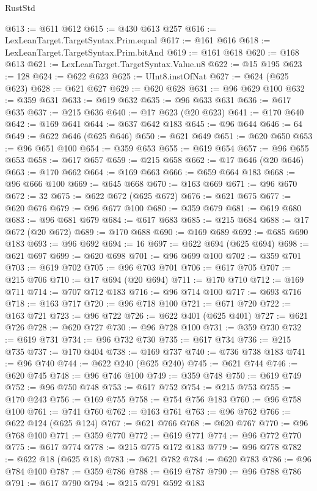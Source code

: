 \begin{lexlean}{RustStd}
\begin{coremodule}
@613 := @611 @612
@615 := @430 @613 @257
@616 := LexLeanTarget.TargetSyntax.Prim.equal
@617 := @161 @616
@618 := LexLeanTarget.TargetSyntax.Prim.bitAnd
@619 := @161 @618
@620 := @168 @613
@621 := LexLeanTarget.TargetSyntax.Value.u8
@622 := @15 @195
@623 := 128
@624 := @622 @623
@625 := UInt8.instOfNat
@627 := @624 (@625 @623)
@628 := @621 @627
@629 := @620 @628
@631 := @96 @629 @100
@632 := @359 @631
@633 := @619 @632
@635 := @96 @633 @631
@636 := @617 @635
@637 := @215 @636
@640 := @17 @623 (@20 @623)
@641 := @170 @640
@642 := @169 @641
@644 := @637 @642 @183
@645 := @96 @644
@646 := 64
@649 := @622 @646 (@625 @646)
@650 := @621 @649
@651 := @620 @650
@653 := @96 @651 @100
@654 := @359 @653
@655 := @619 @654
@657 := @96 @655 @653
@658 := @617 @657
@659 := @215 @658
@662 := @17 @646 (@20 @646)
@663 := @170 @662
@664 := @169 @663
@666 := @659 @664 @183
@668 := @96 @666 @100
@669 := @645 @668
@670 := @163 @669
@671 := @96 @670
@672 := 32
@675 := @622 @672 (@625 @672)
@676 := @621 @675
@677 := @620 @676
@679 := @96 @677 @100
@680 := @359 @679
@681 := @619 @680
@683 := @96 @681 @679
@684 := @617 @683
@685 := @215 @684
@688 := @17 @672 (@20 @672)
@689 := @170 @688
@690 := @169 @689
@692 := @685 @690 @183
@693 := @96 @692
@694 := 16
@697 := @622 @694 (@625 @694)
@698 := @621 @697
@699 := @620 @698
@701 := @96 @699 @100
@702 := @359 @701
@703 := @619 @702
@705 := @96 @703 @701
@706 := @617 @705
@707 := @215 @706
@710 := @17 @694 (@20 @694)
@711 := @170 @710
@712 := @169 @711
@714 := @707 @712 @183
@716 := @96 @714 @100
@717 := @693 @716
@718 := @163 @717
@720 := @96 @718 @100
@721 := @671 @720
@722 := @163 @721
@723 := @96 @722
@726 := @622 @401 (@625 @401)
@727 := @621 @726
@728 := @620 @727
@730 := @96 @728 @100
@731 := @359 @730
@732 := @619 @731
@734 := @96 @732 @730
@735 := @617 @734
@736 := @215 @735
@737 := @170 @404
@738 := @169 @737
@740 := @736 @738 @183
@741 := @96 @740
@744 := @622 @240 (@625 @240)
@745 := @621 @744
@746 := @620 @745
@748 := @96 @746 @100
@749 := @359 @748
@750 := @619 @749
@752 := @96 @750 @748
@753 := @617 @752
@754 := @215 @753
@755 := @170 @243
@756 := @169 @755
@758 := @754 @756 @183
@760 := @96 @758 @100
@761 := @741 @760
@762 := @163 @761
@763 := @96 @762
@766 := @622 @124 (@625 @124)
@767 := @621 @766
@768 := @620 @767
@770 := @96 @768 @100
@771 := @359 @770
@772 := @619 @771
@774 := @96 @772 @770
@775 := @617 @774
@778 := @215 @775 @172 @183
@779 := @96 @778
@782 := @622 @18 (@625 @18)
@783 := @621 @782
@784 := @620 @783
@786 := @96 @784 @100
@787 := @359 @786
@788 := @619 @787
@790 := @96 @788 @786
@791 := @617 @790
@794 := @215 @791 @592 @183

\end{coremodule}
\end{lexlean}
